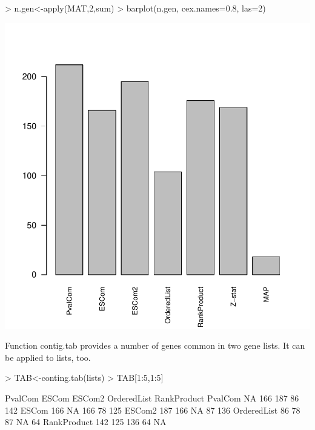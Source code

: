 \documentclass[a4paper]{report}
\begin{document}
\begin{center}
\begin{Schunk}
\begin{Sinput}
> n.gen<-apply(MAT,2,sum)
> barplot(n.gen, cex.names=0.8, las=2)
\end{Sinput}
\end{Schunk}
\includegraphics{MAMA-023}
\end{center}
Function {\ttfamily contig.tab} provides a number of genes common in two gene lists. It can be applied to {\ttfamily lists}, too.
\begin{Schunk}
\begin{Sinput}
> TAB<-conting.tab(lists)
> TAB[1:5,1:5]
\end{Sinput}
\begin{Soutput}
            PvalCom ESCom ESCom2 OrderedList RankProduct
PvalCom          NA   166    187          86         142
ESCom           166    NA    166          78         125
ESCom2          187   166     NA          87         136
OrderedList      86    78     87          NA          64
RankProduct     142   125    136          64          NA
\end{Soutput}
\end{Schunk}
\end{document}
